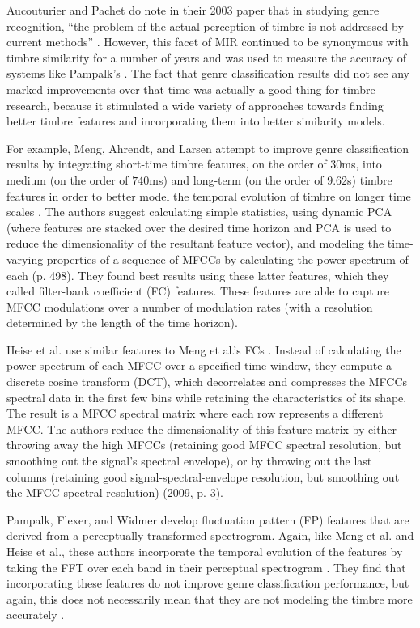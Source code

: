 \documentclass[a4paper,12pt]{report} 	%
\numberwithin{figure}{chapter}
\numberwithin{table}{chapter}
\numberwithin{equation}{chapter}
\begin{document}
\begin{flushleft}
Aucouturier and Pachet do note in their 2003 paper that in studying genre recognition, ``the problem of the actual perception of timbre is not addressed by current methods'' \cite[p. 16]{Aucouturier:2003gs}. However, this facet of MIR continued to be synonymous with timbre similarity for a number of years and was used to measure the accuracy of systems like Pampalk's \cite{Pampalk:2006pr}. The fact that genre classification results did not see any marked improvements over that time was actually a good thing for timbre research, because it stimulated a wide variety of approaches towards finding better timbre features and incorporating them into better similarity models.

For example, Meng, Ahrendt, and Larsen attempt to improve genre classification results by integrating short-time timbre features, on the order of $30$ms, into medium (on the order of $740$ms) and long-term (on the order of $9.62$s) timbre features in order to better model the temporal evolution of timbre on longer time scales \cite[p. 498]{Meng:2005fx}. The authors suggest calculating simple statistics, using dynamic PCA (where features are stacked over the desired time horizon and PCA is used to reduce the dimensionality of the resultant feature vector), and modeling the time-varying properties of a sequence of MFCCs by calculating the power spectrum of each (p. 498). They found best results using these latter features, which they called filter-bank coefficient (FC) features. These features are able to capture MFCC modulations over a number of modulation rates (with a resolution determined by the length of the time horizon). 

Heise et al. use similar features to Meng et al.'s FCs \cite{Heise:2009sp}. Instead of calculating the power spectrum of each MFCC over a specified time window, they compute a discrete cosine transform (DCT), which decorrelates and compresses the MFCCs spectral data in the first few bins while retaining the characteristics of its shape. The result is a MFCC spectral matrix where each row represents a different MFCC. The authors reduce the dimensionality of this feature matrix by either throwing away the high MFCCs (retaining good MFCC spectral resolution, but smoothing out the signal's spectral envelope), or by throwing out the last columns (retaining good signal-spectral-envelope resolution, but smoothing out the MFCC spectral resolution) (2009, p. 3).

Pampalk, Flexer, and Widmer develop fluctuation pattern (FP) features that are derived from a perceptually transformed spectrogram. Again, like Meng et al. and Heise et al., these authors incorporate the temporal evolution of the features by taking the FFT over each band in their perceptual spectrogram \cite[p. 4]{Pampalk:2005ix}. They find that incorporating these features do not improve genre classification performance, but again, this does not necessarily mean that they are not modeling the timbre more accurately \cite[p. 8]{Pampalk:2005ix}.


\end{flushleft}
\end{document}
